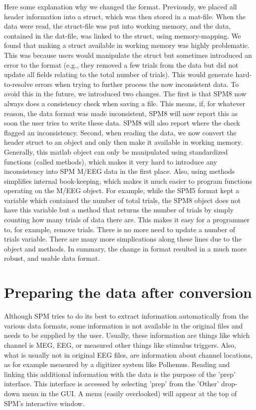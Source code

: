 Here some explanation why we changed the format. Previously, we placed
all header information into a struct, which was then stored in a
mat-file. When the data were read, the struct-file was put into
working memory, and the data, contained in the dat-file, was linked to 
the struct, using memory-mapping. We found that making a struct
available in working memory was highly problematic. This was because
users would manipulate the 
struct but sometimes introduced an error to the format (e.g., they
removed a few 
trials from the data but did not update all fields relating to the
total number of trials). This would generate hard-to-resolve errors
when trying to further process the now inconsistent data. To avoid
this in the future, we introduced two changes. The first is that
SPM8 now 
always does a consistency check when saving a file. This means, if,
for whatever reason, the data format was made inconsistent, SPM8 will
now report this as soon the user tries to write these data. SPM8 will
also report where the check flagged an inconsistency. Second,
when reading the data, we now convert the header struct to an object
and only then make it available in working memory. Generally, this
matlab object can only be manipulated using standardized functions
(called methods), which makes it very hard to introduce any
inconsistency into SPM M/EEG data in the first place. Also, using
methods simplifies internal book-keeping, which makes it much easier
to program functions operating on the M/EEG object. For example, while
the SPM5 format kept a variable which contained the number of total
trials, the SPM8 object does not have this variable but a method that
returns the number of trials by simply counting how many trials of
data there are. This makes it easy for a programmer to, for example,
remove trials. There is no more need to update a number of trials
variable. There are many more simplications along these lines due to
the object and methods. In summary, the change in format resulted in a
much more robust, and usable data format.

\section{Preparing the data after conversion}
Although SPM tries to do its best to extract information automatically
from the various data formats, some information is not available in
the original files and needs to be supplied by the user. Usually,
these information are things like which channel is MEG, EEG, or
measured other things like stimulus triggers. Also, what is usually
not in original EEG files, are information about channel locations, as
for example measured by a digitizer system like Polhemus. 
Reading and linking this additional information with the data is the
purpose of the 'prep' interface. This interface is accessed by
selecting 'prep' from the 'Other' drop-down menu in the GUI.  A menu
(easily overlooked) will appear at the top of SPM's interactive 
window.

